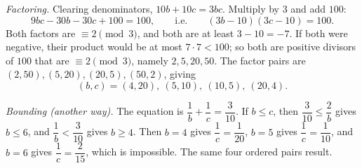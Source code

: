\emph{Factoring.} Clearing denominators, $10b+10c=3bc$. Multiply by $3$ and add $100$:
\[9bc-30b-30c+100=100,\qquad\text{i.e.}\qquad(3b-10)(3c-10)=100.\]
Both factors are $\equiv2\pmod3$, and both are at least $3-10=-7$. If both were negative, their product would be at most $7\cdot7<100$; so both are positive divisors of $100$ that are $\equiv2\pmod3$, namely $2,5,20,50$. The factor pairs are $(2,50),(5,20),(20,5),(50,2)$, giving
\[(b,c)=\boxed{(4,20),\ (5,10),\ (10,5),\ (20,4)}.\]

\emph{Bounding (another way).} The equation is $\dfrac1b+\dfrac1c=\dfrac3{10}$. If $b\le c$, then $\dfrac3{10}\le\dfrac2b$ gives $b\le6$, and $\dfrac1b<\dfrac3{10}$ gives $b\ge4$. Then $b=4$ gives $\dfrac1c=\dfrac1{20}$, $b=5$ gives $\dfrac1c=\dfrac1{10}$, and $b=6$ gives $\dfrac1c=\dfrac2{15}$, which is impossible. The same four ordered pairs result.
